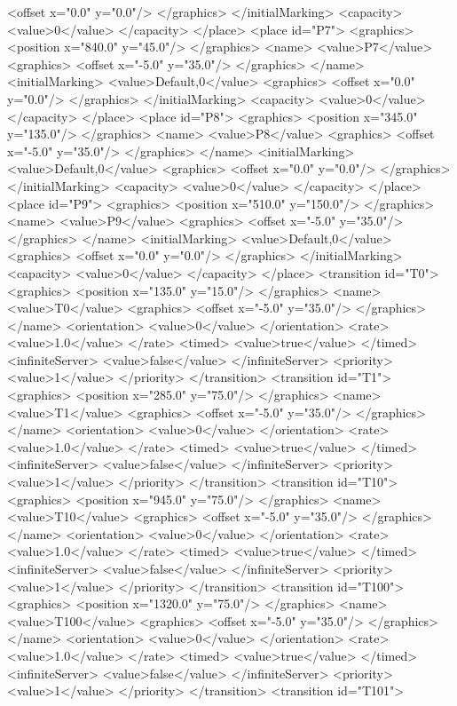 <offset x="0.0" y="0.0"/>
</graphics>
</initialMarking>
<capacity>
<value>0</value>
</capacity>
</place>
<place id="P7">
<graphics>
<position x="840.0" y="45.0"/>
</graphics>
<name>
<value>P7</value>
<graphics>
<offset x="-5.0" y="35.0"/>
</graphics>
</name>
<initialMarking>
<value>Default,0</value>
<graphics>
<offset x="0.0" y="0.0"/>
</graphics>
</initialMarking>
<capacity>
<value>0</value>
</capacity>
</place>
<place id="P8">
<graphics>
<position x="345.0" y="135.0"/>
</graphics>
<name>
<value>P8</value>
<graphics>
<offset x="-5.0" y="35.0"/>
</graphics>
</name>
<initialMarking>
<value>Default,0</value>
<graphics>
<offset x="0.0" y="0.0"/>
</graphics>
</initialMarking>
<capacity>
<value>0</value>
</capacity>
</place>
<place id="P9">
<graphics>
<position x="510.0" y="150.0"/>
</graphics>
<name>
<value>P9</value>
<graphics>
<offset x="-5.0" y="35.0"/>
</graphics>
</name>
<initialMarking>
<value>Default,0</value>
<graphics>
<offset x="0.0" y="0.0"/>
</graphics>
</initialMarking>
<capacity>
<value>0</value>
</capacity>
</place>
<transition id="T0">
<graphics>
<position x="135.0" y="15.0"/>
</graphics>
<name>
<value>T0</value>
<graphics>
<offset x="-5.0" y="35.0"/>
</graphics>
</name>
<orientation>
<value>0</value>
</orientation>
<rate>
<value>1.0</value>
</rate>
<timed>
<value>true</value>
</timed>
<infiniteServer>
<value>false</value>
</infiniteServer>
<priority>
<value>1</value>
</priority>
</transition>
<transition id="T1">
<graphics>
<position x="285.0" y="75.0"/>
</graphics>
<name>
<value>T1</value>
<graphics>
<offset x="-5.0" y="35.0"/>
</graphics>
</name>
<orientation>
<value>0</value>
</orientation>
<rate>
<value>1.0</value>
</rate>
<timed>
<value>true</value>
</timed>
<infiniteServer>
<value>false</value>
</infiniteServer>
<priority>
<value>1</value>
</priority>
</transition>
<transition id="T10">
<graphics>
<position x="945.0" y="75.0"/>
</graphics>
<name>
<value>T10</value>
<graphics>
<offset x="-5.0" y="35.0"/>
</graphics>
</name>
<orientation>
<value>0</value>
</orientation>
<rate>
<value>1.0</value>
</rate>
<timed>
<value>true</value>
</timed>
<infiniteServer>
<value>false</value>
</infiniteServer>
<priority>
<value>1</value>
</priority>
</transition>
<transition id="T100">
<graphics>
<position x="1320.0" y="75.0"/>
</graphics>
<name>
<value>T100</value>
<graphics>
<offset x="-5.0" y="35.0"/>
</graphics>
</name>
<orientation>
<value>0</value>
</orientation>
<rate>
<value>1.0</value>
</rate>
<timed>
<value>true</value>
</timed>
<infiniteServer>
<value>false</value>
</infiniteServer>
<priority>
<value>1</value>
</priority>
</transition>
<transition id="T101">
